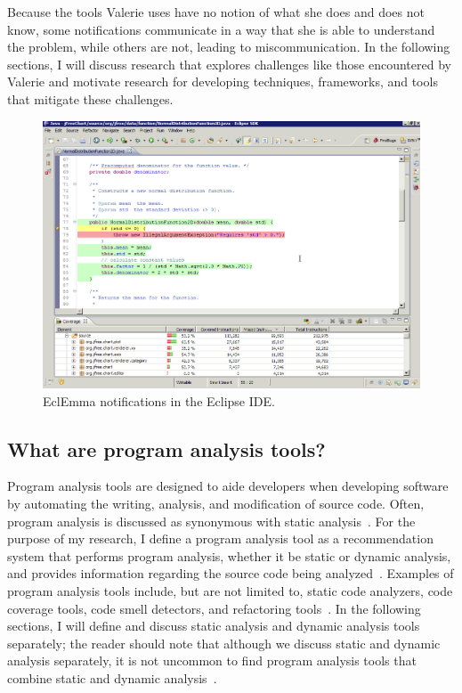 \documentclass{llncs}
\begin{document}
Because the tools Valerie uses have no notion of what she does and does not know, some notifications communicate in a way that she is able to understand the problem, while others are not, leading to  miscommunication. In the following sections, I will discuss research that explores challenges like those encountered by Valerie and motivate research for developing techniques, frameworks, and tools that mitigate these challenges.

\begin{figure} [ht]
	\centering
	\includegraphics[width=\textwidth]{figs/eclemma.png}
	\caption{EclEmma notifications in the Eclipse IDE.}
	\label{fig:ecl}
\end{figure}

\subsection{What are program analysis tools?}
Program analysis tools are designed to aide developers when developing software by automating the writing, analysis, and modification of source code.
Often, program analysis is discussed as synonymous with static analysis~\cite{nielson2015principles}. 
For the purpose of my research, I define a program analysis tool as a recommendation system that performs program analysis, whether it be static or dynamic analysis, and provides information regarding the source code being analyzed~\cite{robillard2014recommendation}.
Examples of program analysis tools include, but are not limited to, static code analyzers, code coverage tools, code smell detectors, and refactoring tools~\cite{adolph2011using,Murphy-Hill:2010:Ambient,ge2012reconciling}.
In the following sections, I will define and discuss static analysis and dynamic analysis tools separately; the reader should note that although we discuss static and dynamic analysis separately, it is not uncommon to find program analysis tools that combine static and dynamic analysis~\cite{ernst2003static}.                                                
\end{document}
